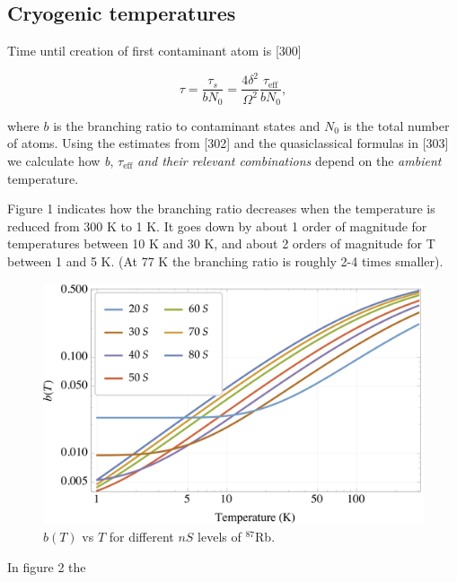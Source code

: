 \documentclass[10pt,twocolumn]{article}
\begin{document}
\subsection*{Cryogenic temperatures}

Time until creation of first contaminant atom is [300]

\begin{displaymath}
\tau = \frac{\tau_s}{bN_0} = \frac{4\delta^2}{\Omega^2}\frac{\tau_{\text{eff}}}{bN_0},
\end{displaymath}

\noindent
where $b$ is the branching ratio to contaminant states and $N_0$ is the total number of atoms. Using the estimates from [302] and the quasiclassical formulas in [303] we calculate how \textit{b}, $\tau_{\text{eff}}$ \textit{and their relevant combinations} depend on the \textit{ambient} temperature.

Figure 1 indicates how the branching ratio decreases when the temperature is reduced from 300 K to 1 K. It goes down by about 1 order of magnitude for temperatures between 10 K and 30 K, and about 2 orders of magnitude for T between 1 and 5 K. (At 77 K the branching ratio is roughly 2-4 times smaller).

\begin{figure}[!h]
\includegraphics[scale=0.75]{bloglog.png} \caption{$b(T)$ vs $T$ for different $nS$ levels of $^{87}$Rb.}
\end{figure}

In figure 2 the
\end{document}
